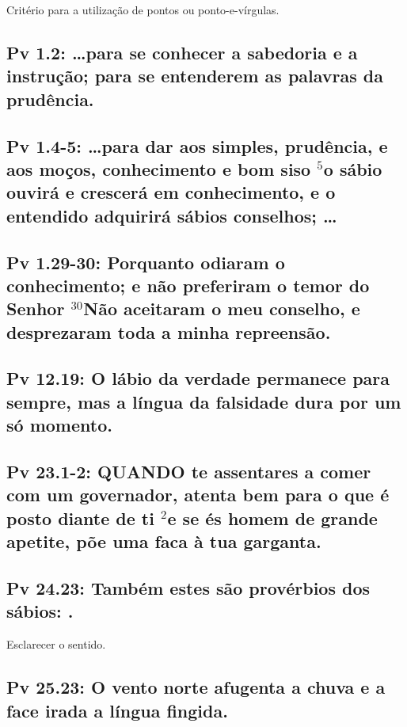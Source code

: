 Critério para a utilização de pontos ou ponto-e-vírgulas.

\subsection{Pv 1.2: \ldots para se conhecer a sabedoria e a instrução; para se entenderem\uwave{,} as palavras da prudência.}

\subsection{Pv 1.4-5: \ldots para dar aos simples, prudência, e aos moços, conhecimento e bom siso\uwave{;} $^{\mathrm{5}}$o sábio ouvirá e crescerá em conhecimento, e o entendido adquirirá sábios conselhos; \ldots}

\subsection{Pv 1.29-30: Porquanto odiaram o conhecimento; e não preferiram o temor do Senhor\uwave{:} $^{\mathrm{30}}$Não aceitaram o meu conselho, e desprezaram toda a minha repreensão.}

\subsection{Pv 12.19: O lábio da verdade permanece para sempre, mas a língua da falsidade\uwave{,} dura por um só momento.}

\subsection{Pv 23.1-2: QUANDO te assentares a comer com um governador, atenta bem para o que é posto diante de ti\uwave{,} $^{\mathrm{2}}$e se és homem de grande apetite, põe uma faca à tua garganta.}

\subsection{Pv 24.23: Também estes são provérbios dos sábios: .}
Esclarecer o sentido.

\subsection{Pv 25.23: O vento norte afugenta a chuva\uwave{,} e a face irada\uwave{,} a língua fingida.}

